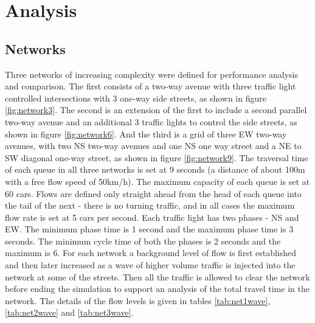 
\section{Analysis}

\subsection{Networks}
Three networks of increasing complexity were defined for performance analysis and comparison. The first consists of a two-way avenue with three traffic light controlled intersections with 3 one-way side streets, as shown in figure \ref{fig:network3}. The second is an extension of the first to include a second parallel two-way avenue and an additional 3 traffic lights to control the side streets, as shown in figure \ref{fig:network6}. And the third is a grid of three EW two-way avenues, with two NS two-way avenues and one NS one way street and a NE to SW diagonal one-way street, as shown in figure \ref{fig:network9}.
The traversal time of each queue in all three networks is set at 9 seconds (a distance of about 100m with a free flow speed of 50km/h). The maximum capacity of each queue is set at 60 cars. Flows are defined only straight ahead from the head of each queue into the tail of the next - there is no turning traffic, and in all cases the maximum flow rate is set at 5 cars per second. Each traffic light has two phases - NS and EW. The minimum phase time is 1 second and the maximum phase time is 3 seconds. The minimum cycle time of both the phases is 2 seconds and the maximum is 6.
For each network a background level of flow is first established and then later increased as a wave of higher volume traffic is injected into the network at some of the streets. Then all the traffic is allowed to clear the network before ending the simulation to support an analysis of the total travel time in the network. The details of the flow levels is given in tables \ref{tab:net1wave},  \ref{tab:net2wave} and  \ref{tab:net3wave}.

